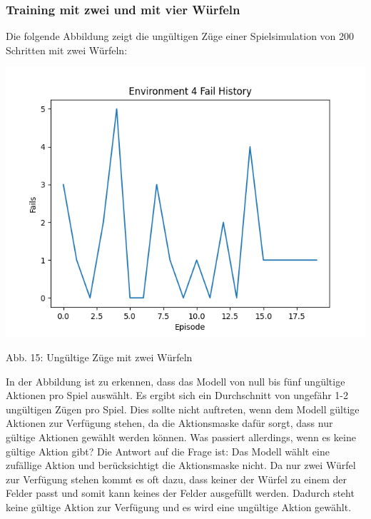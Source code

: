 \subsubsection{Training mit zwei und mit vier Würfeln}
\begin{minipage}{\linewidth}
Die folgende Abbildung zeigt die ungültigen Züge einer Spielsimulation von 200 Schritten mit zwei Würfeln:

	\vspace{0.5cm}
	\includegraphics[width=1\textwidth]{Bilder/failswithtwodice}
	
	Abb. 15: Ungültige Züge mit zwei Würfeln\\
\end{minipage}

In der Abbildung ist zu erkennen, dass das Modell von null bis fünf ungültige Aktionen pro Spiel auswählt. Es ergibt sich ein Durchschnitt von ungefähr 1-2 ungültigen Zügen pro Spiel. Dies sollte nicht auftreten, wenn dem Modell gültige Aktionen zur Verfügung stehen, da die Aktionsmaske dafür sorgt, dass nur gültige Aktionen gewählt werden können. Was passiert allerdings, wenn es keine gültige Aktion gibt? Die Antwort auf die Frage ist: Das Modell wählt eine zufällige Aktion und berücksichtigt die Aktionsmaske nicht. Da nur zwei Würfel zur Verfügung stehen kommt es oft dazu, dass keiner der Würfel zu einem der Felder passt und somit kann keines der Felder ausgefüllt werden. Dadurch steht keine gültige Aktion zur Verfügung und es wird eine ungültige Aktion gewählt.

